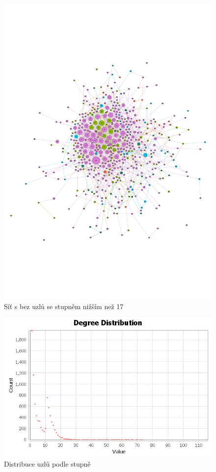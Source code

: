 \documentclass[A4]{article}
\begin{document}
\begin{figure}
    \centering
    \includegraphics[width=1\textwidth]{export-filtered.pdf}
    \caption{Síť s bez uzlů se stupněm nižším než 17}
    \label{network:filtered}
\end{figure}

\begin{figure}
    \centering
    \includegraphics[width=1\textwidth]{degree-report/degree-distribution.png}
    \caption{Distribuce uzlů podle stupně}
    \label{distribution:degree}
\end{figure}
\end{document}
